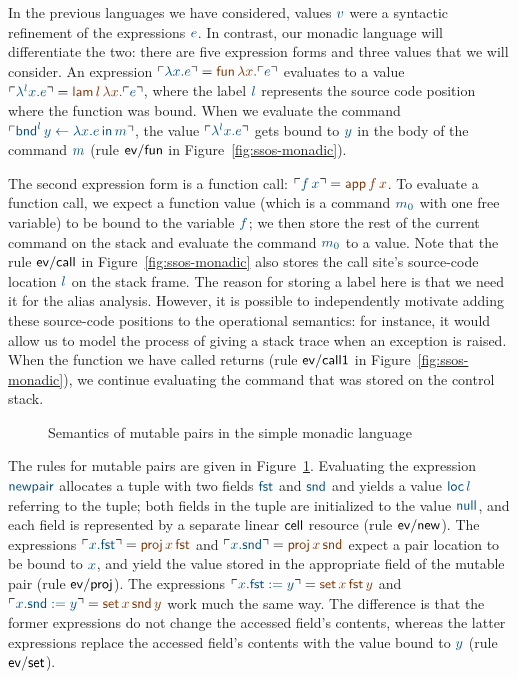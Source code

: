 In the previous languages we have considered, values $\obj{v}$ were a
syntactic refinement of the expressions $\obj{e}$. In contrast, our monadic
language will differentiate the two: there are five expression forms
and three values that we will consider. An expression $\interp{\lambda
  x.e} = \lf{{\sf fun}\,\lambda x.\interp{e}}$ evaluates to a value
$\interp{\lambda^l x.e} = \lf{{\sf lam}\,l\,\lambda x.\interp{e}}$, where
the label $\obj{l}$ represents the source code position where the function
was bound. When we evaluate the command $\interp{{\sf
    bnd}^l \, y \leftarrow \lambda x.e \,{\sf in}\,m}$, the value
$\interp{\lambda^l x.e}$ gets bound to $\obj{y}$ in the body of the command
$\obj{m}$ (rule ${\sf ev/fun}$ in Figure~\ref{fig:ssos-monadic}).

The second expression form is a function call: $\interp{f\,x} = \lf{{\sf
  app}\,f\,x}$. To evaluate a function call, we expect a function value
(which is a command $\obj{m_0}$ with one free variable) to be bound to the
variable $\obj{f}$; we then store the rest of the current command on the
stack and evaluate the command $\obj{m_0}$ to a value. Note that the rule
${\sf ev/call}$ in Figure~\ref{fig:ssos-monadic} also stores the call
site's source-code location $\obj{l}$ on the stack frame. The reason for
storing a label here is that we need it for the alias
analysis. However, it is possible to independently motivate adding
these source-code positions to the operational semantics: for instance, it
would allow us to model the process of giving a stack trace when an
exception is raised. When the function we have called returns (rule
${\sf ev/call1}$ in Figure~\ref{fig:ssos-monadic}), we continue
evaluating the command that was stored on the control stack.

\begin{figure}
\caption{Semantics of mutable pairs in the simple monadic language}
\label{fig:ssos-monadic2}
\end{figure}

The rules for mutable pairs are given in
Figure~\ref{fig:ssos-monadic2}. Evaluating the expression $\obj{\sf
  newpair}$ allocates a tuple with two fields $\obj{\sf fst}$ and 
$\obj{\sf
  snd}$ and yields a value $\obj{{\sf loc}\,l}$ referring to the tuple; both
fields in the tuple are initialized to the value $\obj{\sf null}$, and
each field is represented by a separate linear ${\sf cell}$ resource
(rule ${\sf ev/new}$). The expressions $\interp{x.{\sf fst}} = \lf{{\sf
  proj}\,x\,{\sf fst}}$ and $\interp{x.{\sf snd}} = \lf{{\sf proj}\,x\,{\sf
  snd}}$ expect a pair location to be bound to $\obj{x}$, and yield the value
stored in the appropriate field of the mutable pair (rule ${\sf
  ev/proj}$). The expressions $\interp{x.{\sf fst} := y} = \lf{{\sf
  set}\,x\,{\sf fst}\,y}$ and $\interp{x.{\sf snd} := y} = \lf{{\sf
  set}\,x\,{\sf snd}\,y}$ work much the same way. The difference is
that the former expressions do not change the accessed field's
contents, whereas the latter expressions replace the accessed field's
contents with the value bound to $\obj{y}$ (rule ${\sf ev/set}$).

